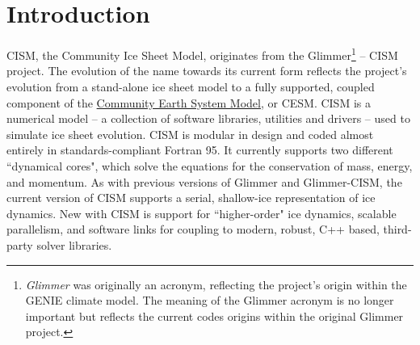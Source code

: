 
\section{Introduction}
%
CISM, the Community Ice Sheet Model, originates from the Glimmer\footnote{{\it Glimmer} 
was originally an acronym, reflecting the project's origin 
within the GENIE climate model. The meaning of the Glimmer acronym is no longer important 
but reflects the current codes origins within the original Glimmer project.} -- CISM project. 
The evolution of the name towards its current form reflects 
the project's evolution from a stand-alone ice sheet model to a fully supported, 
coupled component of the \href{http://www2.cesm.ucar.edu/}{Community Earth System Model}, or CESM. 
CISM is a numerical model -- a collection of software libraries, utilities and drivers  --
 used to simulate ice sheet evolution. CISM is modular in design and coded almost 
entirely in standards-compliant Fortran 95. It currently supports two different 
``dynamical cores", which solve the equations for the conservation of mass, energy, and momentum. 
As with previous versions of Glimmer and Glimmer-CISM, the current version of CISM 
supports a serial, shallow-ice representation of ice dynamics. 
New with CISM is support for ``higher-order" ice dynamics, scalable parallelism, 
and software links for coupling to modern, robust, C++ based, third-party solver libraries. 

%
